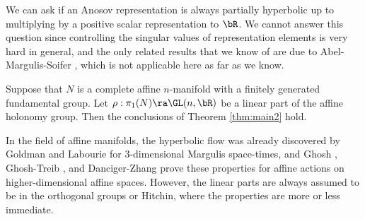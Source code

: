  
We can ask if an Anosov representation is always partially hyperbolic up to multiplying by a positive scalar representation to $\bR$. We cannot answer this question since
controlling the singular values of representation elements is very hard in general, and
the only related results that we know of are due to Abel-Margulis-Soifer \cite{AMS95}, which is not applicable here
as far as we know. 







\begin{corollary}\label{cor:affine}
Suppose that $N$ is a complete affine $n$-manifold with a finitely generated 
 fundamental group. 
Let $\rho:\pi_1(N) \ra \GL(n, \bR)$ be a linear part of the affine holonomy group. 
Then the conclusions of Theorem \ref{thm:main2} hold. 
\end{corollary} 

In the field of affine manifolds, 
the hyperbolic flow was already discovered by Goldman and Labourie \cite{GL12} for $3$-dimensional Margulis space-times, and Ghosh \cite{Ghosh17}, Ghosh-Treib \cite{GhoshTreib21}, and Danciger-Zhang \cite{DZ2019} prove these properties for affine actions on higher-dimensional affine spaces. However, the linear parts are always assumed to be in the orthogonal groups or Hitchin, where the properties are more or less immediate.





